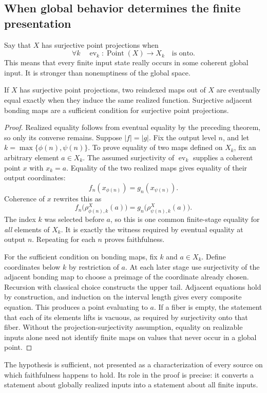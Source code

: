\subsection{When global behavior determines the finite presentation}
Say that \(X\) has surjective point projections when
\[
 \forall k\quad \operatorname{ev}_k:\operatorname{Point}(X)\to X_k
 \quad\text{is onto}.
\]
This means that every finite input state really occurs in some coherent global input. It is stronger than nonemptiness of the global space.

\begin{theorem}\label{KS62}
If \(X\) has surjective point projections, two reindexed maps out of \(X\) are eventually equal exactly when they induce the same realized function. Surjective adjacent bonding maps are a sufficient condition for surjective point projections.
\end{theorem}
\begin{proof}
Realized equality follows from eventual equality by the preceding theorem, so only its converse remains. Suppose \(|f|=|g|\). Fix the output level \(n\), and let \(k=\max\{\phi(n),\psi(n)\}\). To prove equality of two maps defined on \(X_k\), fix an arbitrary element \(a\in X_k\). The assumed surjectivity of \(\operatorname{ev}_k\) supplies a coherent point \(x\) with \(x_k=a\). Equality of the two realized maps gives equality of their output coordinates:
\[
 f_n(x_{\phi(n)})=g_n(x_{\psi(n)}).
\]
Coherence of \(x\) rewrites this as
\[
 f_n\bigl(\rho^X_{\phi(n),k}(a)\bigr)
 =g_n\bigl(\rho^X_{\psi(n),k}(a)\bigr).
\]
The index \(k\) was selected before \(a\), so this is one common finite-stage equality for \emph{all} elements of \(X_k\). It is exactly the witness required by eventual equality at output \(n\). Repeating for each \(n\) proves faithfulness.

For the sufficient condition on bonding maps, fix \(k\) and \(a\in X_k\). Define coordinates below \(k\) by restriction of \(a\). At each later stage use surjectivity of the adjacent bonding map to choose a preimage of the coordinate already chosen. Recursion with classical choice constructs the upper tail. Adjacent equations hold by construction, and induction on the interval length gives every composite equation. This produces a point evaluating to \(a\). If a fiber is empty, the statement that each of its elements lifts is vacuous, as required by surjectivity onto that fiber. Without the projection-surjectivity assumption, equality on realizable inputs alone need not identify finite maps on values that never occur in a global point.
\end{proof}
The hypothesis is sufficient, not presented as a characterization of every source on which faithfulness happens to hold. Its role in the proof is precise: it converts a statement about globally realized inputs into a statement about all finite inputs.

